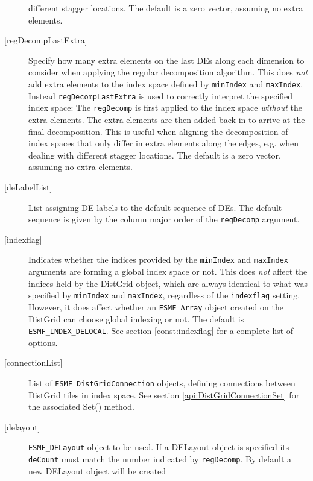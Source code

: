 \begin{description}
            different stagger locations.
            The default is a zero vector, assuming no extra elements.
       \item[{[regDecompLastExtra]}]
            Specify how many extra elements on the last DEs along each 
            dimension to consider when applying the regular decomposition 
            algorithm. This does {\em not} add extra elements to the 
            index space defined by {\tt minIndex} and {\tt maxIndex}. Instead
            {\tt regDecompLastExtra} is used to correctly interpret the 
            specified index space: The {\tt regDecomp} is first applied to the
            index space {\em without} the extra elements. The extra elements are
            then added back in to arrive at the final decomposition. This is 
            useful when aligning the decomposition of index spaces that only
            differ in extra elements along the edges, e.g. when dealing with
            different stagger locations.
            The default is a zero vector, assuming no extra elements.
       \item[{[deLabelList]}]
            List assigning DE labels to the default sequence of DEs. The default
            sequence is given by the column major order of the {\tt regDecomp}
            argument.
       \item[{[indexflag]}]
            Indicates whether the indices provided by the {\tt minIndex} and
            {\tt maxIndex} arguments are forming a global
            index space or not. This does {\em not} affect the indices held
            by the DistGrid object, which are always identical to what was
            specified by {\tt minIndex} and {\tt maxIndex}, regardless of the
            {\tt indexflag} setting. However, it does affect whether an
            {\tt ESMF\_Array} object created on the DistGrid can choose global
            indexing or not. The default is {\tt ESMF\_INDEX\_DELOCAL}.
            See section \ref{const:indexflag} for a complete list of options.
       \item[{[connectionList]}]
            List of {\tt ESMF\_DistGridConnection} objects, defining connections
            between DistGrid tiles in index space.
            See section \ref{api:DistGridConnectionSet} for the associated Set()
            method.
       \item[{[delayout]}]
            {\tt ESMF\_DELayout} object to be used. If a DELayout object is
            specified its {\tt deCount} must match the number indicated by 
            {\tt regDecomp}. By default a new DELayout object will be created 

\end{description}

